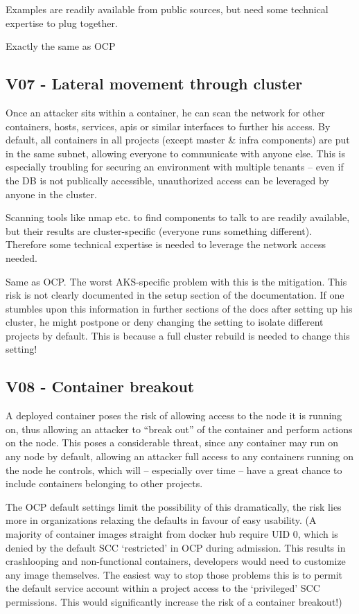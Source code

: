Examples are readily available from public sources, but need some technical expertise to plug together.

Exactly the same as OCP

\subsection{V07 - Lateral movement through cluster}
Once an attacker sits within a container, he can scan the network for other containers, hosts, services, apis or similar interfaces to further his access. By default, all containers in all projects (except master \& infra components) are put in the same subnet, allowing everyone to communicate with anyone else.
This is especially troubling for securing an environment with multiple tenants – even if the DB is not publically accessible, unauthorized access can be leveraged by anyone in the cluster.

Scanning tools like nmap etc. to find components to talk to are readily available, but their results are cluster-specific (everyone runs something different). Therefore some technical expertise is needed to leverage the network access needed. 

Same as OCP. 
The worst AKS-specific problem with this is the mitigation. This risk is not clearly documented in the setup section of the documentation. If one stumbles upon this information in further sections of the docs after setting up his cluster, he might postpone or deny changing the setting to isolate different projects by default. This is because a full cluster rebuild is needed to change this setting!

\subsection{V08 - Container breakout}

A deployed container poses the risk of allowing access to the node it is running on, thus allowing an attacker to “break out” of the container and perform actions on the node.
This poses a considerable threat, since any container may run on any node by default, allowing an attacker full access to any containers running on the node he controls, which will – especially over time – have a great chance to include containers belonging to other projects.

The OCP default settings limit the possibility of this dramatically, the risk lies more in organizations relaxing the defaults in favour of easy usability. (A majority of container images straight from docker hub require UID 0, which is denied by the default SCC ‘restricted’ in OCP during admission. This results in crashlooping and non-functional containers, developers would need to customize any image themselves. The easiest way to stop those problems this is to permit the default service account within a project access to the ‘privileged’ SCC permissions. This would significantly increase the risk of a container breakout!)

